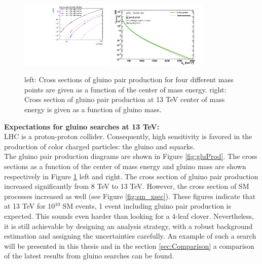 \begin{figure}[!hb]
\centering
  \includegraphics[width=0.4\textwidth]{Plots/SUSY/gluino_xsec}
  \includegraphics[width=0.42\textwidth]{Plots/SUSY/XSectionPlots_13TeV}
  \caption{ left: Cross sections of gluino pair production for four different mass points are given as a function of the center of mass energy. right: Cross section of gluino pair production at 13 TeV center of mass energy is given as a function of gluino mass.
  ~\cite{gluxsec}
  }
  \label{fig:glu_xsec}
\end{figure}
\textbf{Expectations for gluino searches at 13 TeV:}
\\
LHC is a proton-proton collider. Consequently, high sensitivity is favored in the production of color charged particles: the gluino and squarks.\\
The gluino pair production diagrams are shown in Figure \ref{fig:gluProd}. The cross sections as a function of the center of mass energy and gluino mass are shown respectively in Figure  \ref{fig:glu_xsec} left and right. The cross section of gluino pair production increased significantly from 8 TeV to 13 TeV. However, the cross section of SM processes increased as well (see Figure \ref{fig:sm_xsec}). These figures indicate that at 13 TeV for 10$^{10}$ SM events, 1 event including gluino pair production is expected. This sounds even harder than looking for a 4-leaf clover. Nevertheless, it is still achievable by designing an analysis strategy, with a robust background estimation and assigning the uncertainties carefully. An example of such a search will be presented in this thesis and in the section \ref{sec:Comparison} a comparison of the latest results from gluino searches can be found.\\
